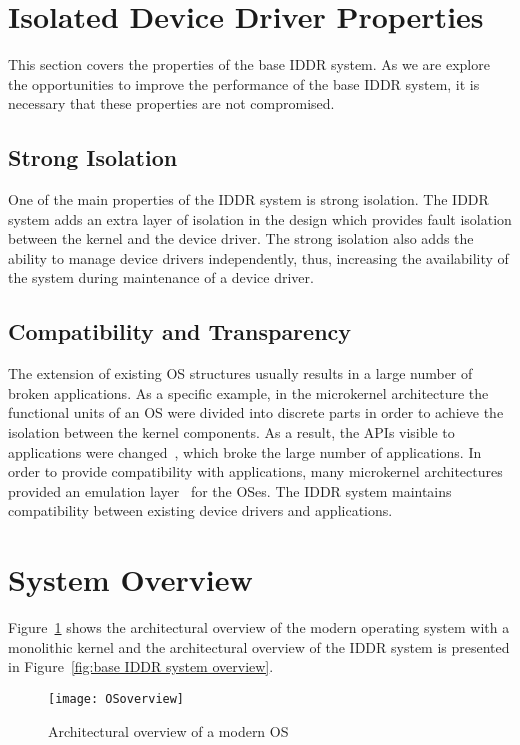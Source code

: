 \section{Isolated Device Driver Properties}
\label{sec:properties}
This section covers the properties of the base IDDR system. As we are explore the opportunities to improve the performance of the base IDDR system, it is necessary that these properties are not compromised.

\subsection*{Strong Isolation}
One of the main properties of the IDDR system is strong isolation. The IDDR system adds an extra layer of isolation in the design which provides fault isolation between the kernel and the device driver. The strong isolation also adds the ability to manage device drivers independently, thus, increasing the availability of the system during maintenance of a device driver.

\subsection*{Compatibility and Transparency} 
The extension of existing OS structures usually results in a large number of broken applications. As a specific example, in the microkernel architecture the functional units of an OS were divided into discrete parts in order to achieve the isolation between the kernel components. As a result, the APIs visible to applications were changed~\cite{hand2005virtual}, which broke the large number of applications. In order to provide compatibility with applications, many microkernel architectures provided an emulation layer~\cite{hand2005virtual} for the OSes. The IDDR system maintains compatibility between existing device drivers and applications.

\section{System Overview}\label{overview}

Figure~\ref{fig:monolithic} shows the architectural overview of the modern operating system with a monolithic kernel and the architectural overview of the IDDR system is presented in Figure~\ref{fig:base IDDR system overview}.
\\[3mm]
\begin{figure}[!ht]
\centering
\texttt{[image: OSoverview]}
\caption{Architectural overview of a modern OS}
\label{fig:monolithic}
\end{figure}


